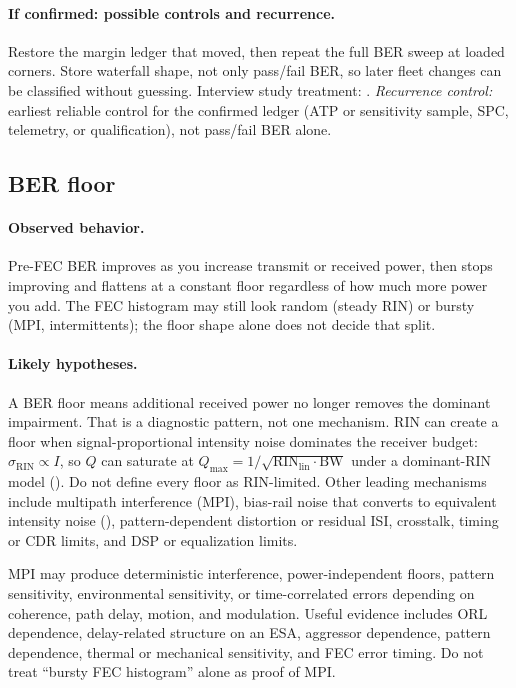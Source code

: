 \paragraph{If confirmed: possible controls and recurrence.}
Restore the margin ledger that moved, then repeat the full BER sweep at loaded
corners. Store waterfall shape, not only pass/fail BER, so later fleet changes
can be classified without guessing. Interview study treatment:
.
\emph{Recurrence control:} earliest reliable control for the confirmed ledger
(ATP or sensitivity sample, SPC, telemetry, or qualification), not pass/fail BER
alone.

\subsection{BER floor}
\label{sec:fm-ber-floor}

\paragraph{Observed behavior.}
Pre-FEC BER improves as you increase transmit or received power, then stops
improving and flattens at a constant floor regardless of how much more power
you add. The FEC histogram may still look random (steady RIN) or bursty
(MPI, intermittents); the floor shape alone does not decide that split.

\paragraph{Likely hypotheses.}
A BER floor means additional received power no longer removes the dominant
impairment. That is a diagnostic pattern, not one mechanism. RIN can create a
floor when signal-proportional intensity noise dominates the receiver budget:
$\sigma_\mathrm{RIN} \propto I$, so $Q$ can saturate at
$Q_\mathrm{max} = 1/\sqrt{\mathrm{RIN}_\mathrm{lin} \cdot \mathrm{BW}}$ under a
dominant-RIN model (). Do not define every floor as RIN-limited.
Other leading mechanisms include multipath interference (MPI), bias-rail noise
that converts to equivalent intensity noise (),
pattern-dependent distortion or residual ISI, crosstalk, timing or CDR limits,
and DSP or equalization limits.

MPI may produce deterministic interference, power-independent floors, pattern
sensitivity, environmental sensitivity, or time-correlated errors depending on
coherence, path delay, motion, and modulation. Useful evidence includes ORL
dependence, delay-related structure on an ESA, aggressor dependence, pattern
dependence, thermal or mechanical sensitivity, and FEC error timing. Do not treat
``bursty FEC histogram'' alone as proof of MPI.

